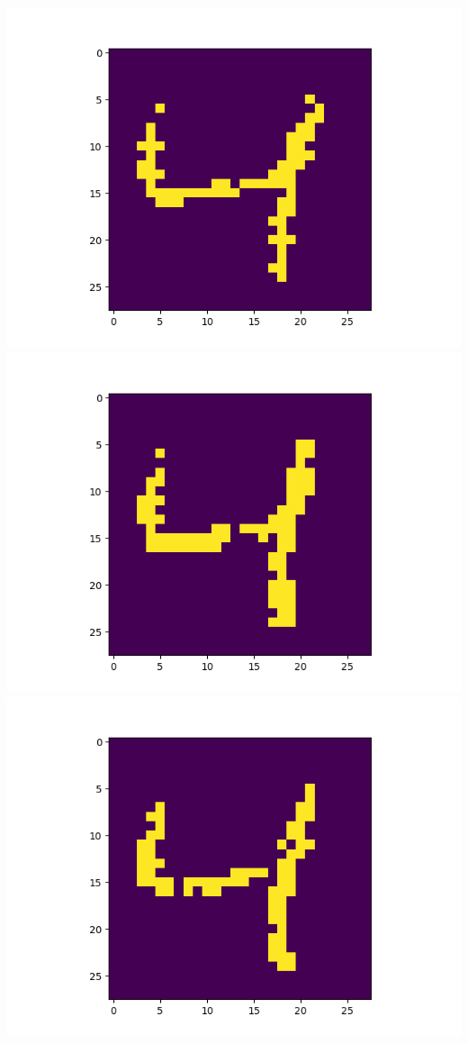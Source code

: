 \includegraphics[scale=0.2]{./bilder/comparison/prob/25}
\includegraphics[scale=0.2]{./bilder/comparison/prob/26}
\includegraphics[scale=0.2]{./bilder/comparison/prob/27}
